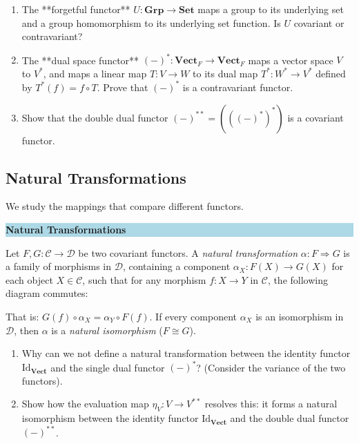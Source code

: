 \documentclass[12pt, a4paper]{article}
\newenvironment{namedconcept}[1]
  {\par\medskip\fillcolorbox{LightBlue}{NavyBlue}{#1}}
  {\par\medskip}
\newcommand{\fillcolorbox}[3]{%
  \noindent
  \filldrawbox{#1}{#2}{\textbf{\sffamily\color{white}#3}}\par\nobreak\vspace{4pt}
}
\newcommand{\filldrawbox}[3]{%
  \colorbox{#1}{\parbox{\dimexpr\linewidth-2\fboxsep\relax}{%
    \vspace{4pt}\noindent\hspace{4pt}#3\vspace{4pt}%
  }}%
}
\newcommand{\newterm}[1]{\textit{\textcolor{DiscoveryColor}{#1}}}
\begin{document}
\begin{enumerate}[label=(\alph*), leftmargin=*]
  \item The **forgetful functor** $U: \mathbf{Grp} \to \mathbf{Set}$ maps a group to its underlying set and a group homomorphism to its underlying set function. Is $U$ covariant or contravariant?
  \item The **dual space functor** $(-)^*: \mathbf{Vect}_F \to \mathbf{Vect}_F$ maps a vector space $V$ to $V^*$, and maps a linear map $T: V \to W$ to its dual map $T^*: W^* \to V^*$ defined by $T^*(f) = f \circ T$.
        Prove that $(-)^*$ is a contravariant functor.
  \item Show that the double dual functor $(-)^{**} = (((-)^*)^*)$ is a covariant functor.
\end{enumerate}

\subsection{Natural Transformations}

We study the mappings that compare different functors.

\begin{namedconcept}{Natural Transformations}
Let $F, G: \mathcal{C} \to \mathcal{D}$ be two covariant functors.
A \newterm{natural transformation} $\alpha: F \Rightarrow G$ is a family of morphisms in $\mathcal{D}$, containing a component $\alpha_X: F(X) \to G(X)$ for each object $X \in \mathcal{C}$, such that for any morphism $f: X \to Y$ in $\mathcal{C}$, the following diagram commutes:
\begin{center}
\end{center}
That is: $G(f) \circ \alpha_X = \alpha_Y \circ F(f)$.
If every component $\alpha_X$ is an isomorphism in $\mathcal{D}$, then $\alpha$ is a \newterm{natural isomorphism} ($F \cong G$).
\end{namedconcept}

\begin{enumerate}[label=(\alph*), leftmargin=*]
  \item Why can we not define a natural transformation between the identity functor $\text{Id}_{\mathbf{Vect}}$ and the single dual functor $(-)^*$? (Consider the variance of the two functors).
  \item Show how the evaluation map $\eta_V: V \to V^{**}$ resolves this: it forms a natural isomorphism between the identity functor $\text{Id}_{\mathbf{Vect}}$ and the double dual functor $(-)^{**}$.
\end{enumerate}
\end{document}
